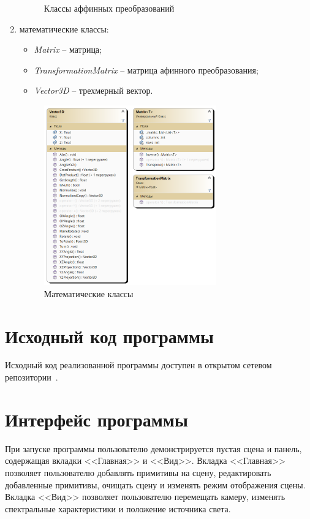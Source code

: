\begin{enumerate}
\begin{figure}[h]
		\caption{Классы аффинных преобразований} 
		\label{fig:transformation-class} 
	\end{figure}
	\item математические классы:
	\begin{itemize}[label=--]
		\item \textit{Matrix} -- матрица;
		\item \textit{TransformationMatrix} -- матрица афинного преобразования;
		\item \textit{Vector3D} -- трехмерный вектор.
	\end{itemize}
	\begin{figure}[h] 
		\centering
		\includegraphics[width=0.7\textwidth]{images/math-class.png}
		\caption{Математические классы} 
		\label{fig:math-class} 
	\end{figure}
\end{enumerate}

\section{Исходный код программы}

Исходный код реализованной программы доступен в открытом сетевом репозитории~\cite{lit11}.

\section{Интерфейс программы}

При запуске программы пользователю демонстрируется пустая сцена и панель, содержащая вкладки <<Главная>> и <<Вид>>. Вкладка <<Главная>> позволяет пользователю добавлять примитивы на сцену, редактировать добавленные примитивы, очищать сцену и изменять режим отображения сцены. Вкладка <<Вид>> позволяет пользователю перемещать камеру, изменять спектральные характеристики и положение источника света.

